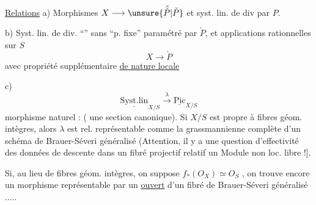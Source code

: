 \uline{Relations} a) Morphismes $X\longrightarrow\unsure{\check{\check{P}}|\check{P}}$ et syst. lin. de div  par $P$.

b) Syst. lin. de div. ``'' sans ``p. fixe'' paramétré par $\check{P}$, et applications rationnelles sur $S$
\[
X\longrightarrow\check{P}
\]
avec  propriété supplémentaire \uline{de nature locale}

c)
\[
\underline{\mathrm{Syst.lin}}_{X/S}\xrightarrow{\lambda}\underline{\mathrm{Pic}}_{X/S}
\]
morphisme naturel : (  une section canonique). Si $X/S$ est propre à fibres géom. intègres, alors $\lambda$ est rel. représentable comme la grassmannienne complète d'un schéma de Brauer-Séveri généralisé (Attention, il y a une question d'effectivité des données de descente dans un fibré projectif relatif un Module non loc. libre !].

Si, au lieu de fibres géom. intègres, on suppose $f_*(O_X)\simeq O_S$ , on trouve encore un morphisme représentable par un \uline{ouvert} d'un fibré  de Brauer-Séveri généralisé .....

